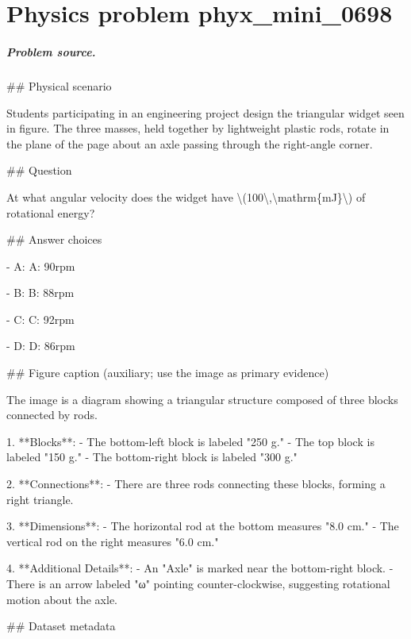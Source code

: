 
\chapter{Physics problem phyx\_mini\_0698}
\label{ch:PhyXMiniProblems_problem_phyx_mini_0698}

\paragraph{Problem source.}
\#\# Physical scenario

Students participating in an engineering project design the triangular widget seen in figure. The three masses, held together by lightweight plastic rods, rotate in the plane of the page about an axle passing through the right-angle corner.

\#\# Question

At what angular velocity does the widget have \textbackslash{}(100\textbackslash{},\textbackslash{}mathrm\{mJ\}\textbackslash{}) of rotational energy?

\#\# Answer choices

- A: A: 90rpm

- B: B: 88rpm

- C: C: 92rpm

- D: D: 86rpm

\#\# Figure caption (auxiliary; use the image as primary evidence)

The image is a diagram showing a triangular structure composed of three blocks connected by rods. 

1. **Blocks**: 
   - The bottom-left block is labeled "250 g."
   - The top block is labeled "150 g."
   - The bottom-right block is labeled "300 g."

2. **Connections**:
   - There are three rods connecting these blocks, forming a right triangle.

3. **Dimensions**:
   - The horizontal rod at the bottom measures "8.0 cm."
   - The vertical rod on the right measures "6.0 cm."

4. **Additional Details**:
   - An "Axle" is marked near the bottom-right block.
   - There is an arrow labeled "ω" pointing counter-clockwise, suggesting rotational motion about the axle.

\#\# Dataset metadata

